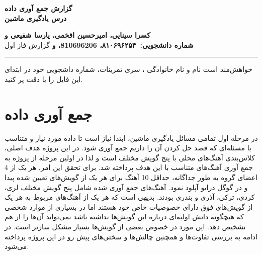 
\def \Subject {گزارش جمع آوری داده }
\def \Course {درس یادگیری ماشین}
\def \Author {کسرا سینایی، امیرحسین افخمی، پارسا شفیعی و }
\def \Report {گزارش فاز اول}
\def \StudentNumber {۸۱۰۶۹۶۲۵۴، 810696206، و }

\begin{center}
\vspace{.4cm}
{\bf {\huge \Subject}}\\
{\bf \Large \Course}
\vspace{.2cm}
\end{center}
{\bf \Author }  \\
{\bf شماره دانشجویی:\ \StudentNumber}
\hspace{\fill} 
{\Large \Report} \\
\hrule
\vspace{0.8cm}

\clearpage

\par
 خواهش‌مند است نام و نام خانوادگی ، سری تمرینات، شماره داشجویی خود در ابتدای این فایل را با دقت پر کنید.

\section{جمع آوری داده}
در مرحله اول تمامی مسائل یادگیری ماشین، ابتدا نیاز است تا داده مورد نیاز و متناسب با مسئله‌ای که قصد حل کردن آن را داریم جمع آوری شود.
در این پروژه هدف اصلی، کلاس‌بندی آهنگ‌های محلی با پنج گویش مختلف است و لذا در اولین مرحله از پروژه به جمع آوری آهنگ‌های متناسب با این هدف پرداخته شد.
برای تحقق این امر، هر یک از 4 اعضای گروه به طور جداگانه، حداقل 10 آهنگ برای هر یک از گویش‌های تعیین شده پیدا و در گوگل درایو آپلود نمود.
آهنگ‌های جمع آوری شده شامل پنج گویش مختلف لری، کردی، ترکی، آذری و بندری بودند.
بدیهی است که هر یک از آهنگ‌های مربوط به هر یک از گویش‌های فوق دارای خصوصیات خاص خود هستند اما در بسیاری از موارد شخصی که هیچگونه دانش اولیه‌ای درباره این گویش‌ها نداشته باشد
نمی‌تواند آن‌ها را از هم تشخیص دهد. این مورد در خصوص بعضی از گویش‌ها بسیار مشکل سازتر است. در ادامه به بررسی تفاوت‌ها و همچنین چالش‌ها و سختی‌های پیش رو در این پروژه پرداخته می‌شود.

